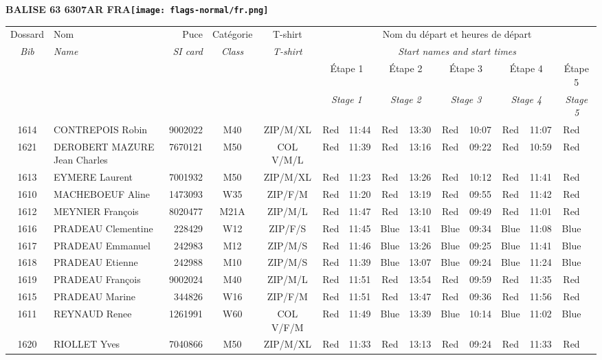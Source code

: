 \documentclass{report}
\begin{document}
\newpage
  \Huge \centering \bfseries BALISE 63 6307AR FRA\normalfont \footnotesize \sffamily \hfill \texttt{[image: flags-normal/fr.png]} \newline 
  \begin{longtable}{|c|l|r|c|c|*{5}{cc|}}
    Dossard & Nom  & Puce    & Catégorie & T-shirt & \multicolumn{10}{c|}{Nom du départ et heures de départ} \\
    \itshape Bib     & \itshape Name & \itshape SI card & \itshape Class  & \itshape  T-shirt  & \multicolumn{10}{c|}{\itshape Start names and start times} \\
    \hline
    & & & & & \multicolumn{2}{c|}{Étape 1} & \multicolumn{2}{c|}{Étape 2} & \multicolumn{2}{c|}{Étape 3} & \multicolumn{2}{c|}{Étape 4} & \multicolumn{2}{c|}{Étape 5} \\
    & & & & & \multicolumn{2}{c|}{\itshape Stage 1} & \multicolumn{2}{c|}{\itshape Stage 2} & \multicolumn{2}{c|}{\itshape Stage 3} & \multicolumn{2}{c|}{\itshape Stage 4} & \multicolumn{2}{c|}{\itshape Stage 5} \\
    \hline
    1614 & CONTREPOIS Robin & 9002022 & M40 & ZIP/M/XL & Red & 11:44 & Red & 13:30 & Red & 10:07 & Red & 11:07 & Red &  \\
    1621 & DEROBERT MAZURE Jean Charles & 7670121 & M50 & COL V/M/L & Red & 11:39 & Red & 13:16 & Red & 09:22 & Red & 10:59 & Red &  \\
    1613 & EYMERE Laurent & 7001932 & M50 & ZIP/M/XL & Red & 11:23 & Red & 13:26 & Red & 10:12 & Red & 11:41 & Red &  \\
    1610 & MACHEBOEUF Aline & 1473093 & W35 & ZIP/F/M & Red & 11:20 & Red & 13:19 & Red & 09:55 & Red & 11:42 & Red &  \\
    1612 & MEYNIER François & 8020477 & M21A & ZIP/M/L & Red & 11:47 & Red & 13:10 & Red & 09:49 & Red & 11:01 & Red &  \\
    1616 & PRADEAU Clementine & 228429 & W12 & ZIP/F/S & Red & 11:45 & Blue & 13:41 & Blue & 09:34 & Blue & 11:08 & Blue &  \\
    1617 & PRADEAU Emmanuel & 242983 & M12 & ZIP/M/S & Red & 11:46 & Blue & 13:26 & Blue & 09:25 & Blue & 11:41 & Blue &  \\
    1618 & PRADEAU Etienne & 242988 & M10 & ZIP/M/S & Red & 11:39 & Blue & 13:07 & Blue & 09:24 & Blue & 11:24 & Blue &  \\
    1619 & PRADEAU François & 9002024 & M40 & ZIP/M/L & Red & 11:51 & Red & 13:54 & Red & 09:59 & Red & 11:35 & Red &  \\
    1615 & PRADEAU Marine & 344826 & W16 & ZIP/F/M & Red & 11:51 & Red & 13:47 & Red & 09:36 & Red & 11:56 & Red &  \\
    1611 & REYNAUD Renee & 1261991 & W60 & COL V/F/M & Red & 11:49 & Blue & 13:39 & Blue & 10:14 & Blue & 11:02 & Blue &  \\
    1620 & RIOLLET Yves & 7040866 & M50 & ZIP/M/XL & Red & 11:33 & Red & 13:13 & Red & 09:24 & Red & 11:33 & Red &  \\
  \end{longtable}
\end{document}
